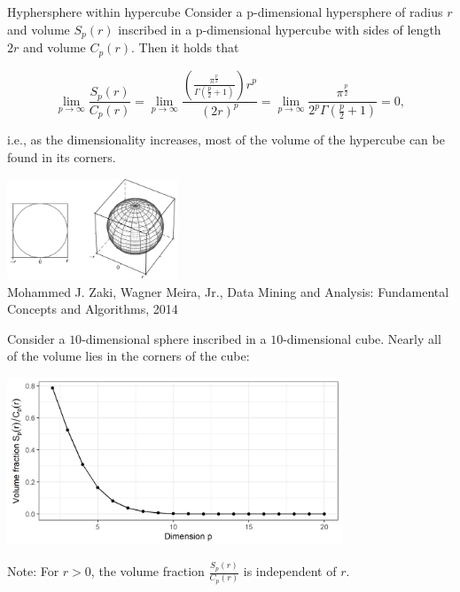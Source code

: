 \begin{vbframe}{Hyphersphere within hypercube}
Consider a p-dimensional hypersphere of radius $r$ and volume $S_p(r)$ inscribed in a p-dimensional hypercube with sides of length $2r$ and volume $C_p(r)$. Then it holds that 
\begin{footnotesize}
$$\lim_{p\rightarrow \infty} \frac{S_p(r)}{C_p(r)} = \lim_{p\rightarrow \infty}
\frac{\left( \frac{\pi^{\frac{p}{2}}}{\Gamma(\frac{p}{2}+1)} \right)r^p}{(2r)^p} =
 \lim_{p\rightarrow \infty} \frac{\pi^{\frac{p}{2}}}{2^p\Gamma(\frac{p}{2}+1)} = 0,$$
\end{footnotesize}
i.e., as the dimensionality increases, most of the volume of the hypercube can be found in its corners.

\begin{center}
\includegraphics[height = 3cm, keepaspectratio]{figure_man/sphere_in_cube.png}\\
\scriptsize{Mohammed J. Zaki, Wagner Meira, Jr., Data Mining and Analysis: Fundamental Concepts and Algorithms, 2014}
\end{center}

\framebreak

Consider a $10$-dimensional sphere inscribed in a $10$-dimensional cube. Nearly all of the volume lies in the corners of the cube:
\medskip

\vspace*{0.1cm}
\begin{center}
\includegraphics[width = 10cm ]{figure/vol_dim_plot.png}
\end{center}

\begin{footnotesize}
Note: For $r > 0$, the volume fraction $\frac{S_p(r)}{C_p(r)}$ is independent of 
$r$.
\end{footnotesize}

\end{vbframe}


